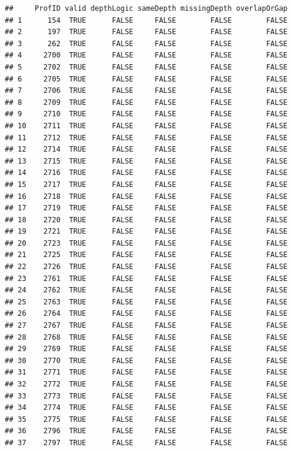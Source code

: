 \documentclass[
  10pt,
  b5paper,
  oneside]{book}
\begin{document}
\begin{verbatim}
##     ProfID valid depthLogic sameDepth missingDepth overlapOrGap
## 1      154  TRUE      FALSE     FALSE        FALSE        FALSE
## 2      197  TRUE      FALSE     FALSE        FALSE        FALSE
## 3      262  TRUE      FALSE     FALSE        FALSE        FALSE
## 4     2700  TRUE      FALSE     FALSE        FALSE        FALSE
## 5     2702  TRUE      FALSE     FALSE        FALSE        FALSE
## 6     2705  TRUE      FALSE     FALSE        FALSE        FALSE
## 7     2706  TRUE      FALSE     FALSE        FALSE        FALSE
## 8     2709  TRUE      FALSE     FALSE        FALSE        FALSE
## 9     2710  TRUE      FALSE     FALSE        FALSE        FALSE
## 10    2711  TRUE      FALSE     FALSE        FALSE        FALSE
## 11    2712  TRUE      FALSE     FALSE        FALSE        FALSE
## 12    2714  TRUE      FALSE     FALSE        FALSE        FALSE
## 13    2715  TRUE      FALSE     FALSE        FALSE        FALSE
## 14    2716  TRUE      FALSE     FALSE        FALSE        FALSE
## 15    2717  TRUE      FALSE     FALSE        FALSE        FALSE
## 16    2718  TRUE      FALSE     FALSE        FALSE        FALSE
## 17    2719  TRUE      FALSE     FALSE        FALSE        FALSE
## 18    2720  TRUE      FALSE     FALSE        FALSE        FALSE
## 19    2721  TRUE      FALSE     FALSE        FALSE        FALSE
## 20    2723  TRUE      FALSE     FALSE        FALSE        FALSE
## 21    2725  TRUE      FALSE     FALSE        FALSE        FALSE
## 22    2726  TRUE      FALSE     FALSE        FALSE        FALSE
## 23    2761  TRUE      FALSE     FALSE        FALSE        FALSE
## 24    2762  TRUE      FALSE     FALSE        FALSE        FALSE
## 25    2763  TRUE      FALSE     FALSE        FALSE        FALSE
## 26    2764  TRUE      FALSE     FALSE        FALSE        FALSE
## 27    2767  TRUE      FALSE     FALSE        FALSE        FALSE
## 28    2768  TRUE      FALSE     FALSE        FALSE        FALSE
## 29    2769  TRUE      FALSE     FALSE        FALSE        FALSE
## 30    2770  TRUE      FALSE     FALSE        FALSE        FALSE
## 31    2771  TRUE      FALSE     FALSE        FALSE        FALSE
## 32    2772  TRUE      FALSE     FALSE        FALSE        FALSE
## 33    2773  TRUE      FALSE     FALSE        FALSE        FALSE
## 34    2774  TRUE      FALSE     FALSE        FALSE        FALSE
## 35    2775  TRUE      FALSE     FALSE        FALSE        FALSE
## 36    2796  TRUE      FALSE     FALSE        FALSE        FALSE
## 37    2797  TRUE      FALSE     FALSE        FALSE        FALSE

\end{verbatim}
\end{document}
